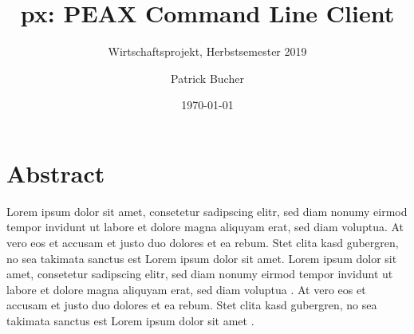 \author{Patrick Bucher}
\title{px: PEAX Command Line Client}
\subtitle{Wirtschaftsprojekt, Herbstsemester 2019}
\date{\today}
\maketitle

\section*{Abstract}

Lorem ipsum dolor sit amet, consetetur sadipscing elitr, sed diam nonumy eirmod tempor invidunt ut labore et dolore magna aliquyam erat, sed diam voluptua. At vero eos et accusam et justo duo dolores et ea rebum. Stet clita kasd gubergren, no sea takimata sanctus est Lorem ipsum dolor sit amet. Lorem ipsum dolor sit amet, consetetur sadipscing elitr, sed diam nonumy eirmod tempor invidunt ut labore et dolore magna aliquyam erat, sed diam voluptua \cite[p. 88]{unixphil}. At vero eos et accusam et justo duo dolores et ea rebum. Stet clita kasd gubergren, no sea takimata sanctus est Lorem ipsum dolor sit amet \cite[p. 23]{gopl}.
